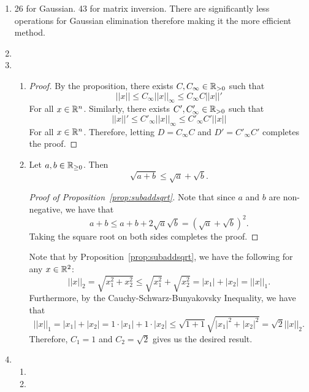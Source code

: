 \documentclass[12pt]{article}
\begin{document}
\begin{enumerate}[leftmargin=2em]
    \item 
    26 for Gaussian. 43 for matrix inversion. There are significantly less operations for Gaussian elimination therefore making it the more efficient method.
    \item 


    \item
    \begin{enumerate}[leftmargin=!]
        \item 
        \begin{proof}
            By the proposition, there exists $C, C_{\infty}\in \mathbb{R}_{>0}$ such that
            \[||x||\leq C_{\infty} ||x||_{\infty}\leq C_{\infty} C ||x||'\]
            For all $x\in \mathbb{R}^{n}$. Similarly, there exists $C',C'_{\infty}\in \mathbb{R}_{>0}$ such that 
            \[||x||' \leq C'_{\infty} ||x||_{\infty} \leq C'_{\infty} C' ||x||\]
            For all $x\in \mathbb{R}^n$. Therefore, letting $D=C_{\infty}C$ and $D'=  C'_{\infty} C'$ completes the proof.
        \end{proof}
        \item 
        \begin{proposition}\label{prop:subaddsqrt}
            Let $a,b\in \mathbb{R}_{\geq 0}$. Then
            \[\sqrt{a+b} \leq \sqrt{a}+\sqrt{b}.\]
        \end{proposition}
        \begin{proof}[Proof of Proposition~\ref{prop:subaddsqrt}]
            Note that since $a$ and $b$ are non-negative, we have that
            \[a+b \leq a+b+2\sqrt{a}\sqrt{b} = {(\sqrt{a}+\sqrt{b})}^2.\]
            Taking the square root on both sides completes the proof.
        \end{proof}

        Note that by Proposition~\ref{prop:subaddsqrt}, we have the following for any $x\in \mathbb{R}^2$:
        \[||x||_{2}=\sqrt{x_1^2+x_2^2} \leq \sqrt{x_1^2}+\sqrt{x_2^2} = |x_1|+|x_2| = ||x||_{1}.\]
        Furthermore, by the Cauchy-Schwarz-Bunyakovsky Inequality, we have that
        \[||x||_{1} = |x_1|+|x_2| = 1\cdot |x_1|+1\cdot|x_2| \leq \sqrt{1+1}\sqrt{|x_1|^2+|x_2|^2} = \sqrt{2}||x||_{2}.\]
        Therefore, $C_1=1$ and $C_2 = \sqrt{2}$ gives us the desired result.
    \end{enumerate}

    \item
    \begin{enumerate}[leftmargin=!]
        \item 

        \item
    \end{enumerate}
    
\end{enumerate}
\end{document}
